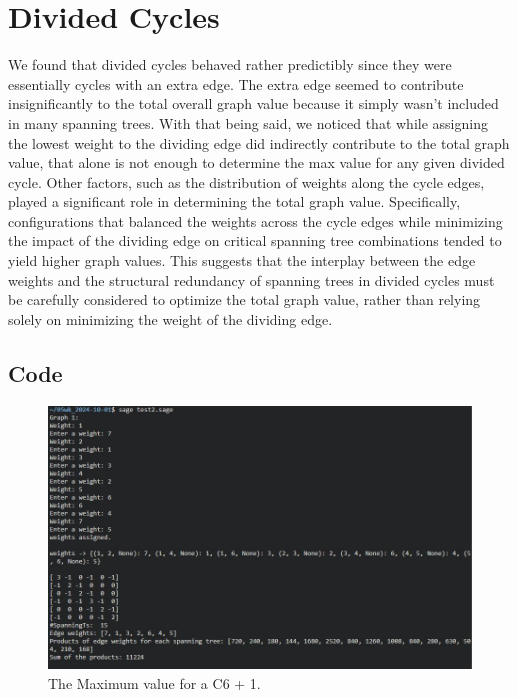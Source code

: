 \documentclass[12pt,letterpaper]{article}
\begin{document}
\section{Divided Cycles} \label{DC}
We found that divided cycles behaved rather predictibly since they were essentially cycles with an extra edge. The extra edge seemed to contribute insignificantly to the total overall graph value because it simply wasn't included in many spanning trees. With that being said, we noticed that while assigning the lowest weight to the dividing edge did indirectly contribute to the total graph value, that alone is not enough to determine the max value for any given divided cycle. Other factors, such as the distribution of weights along the cycle edges, played a significant role in determining the total graph value. Specifically, configurations that balanced the weights across the cycle edges while minimizing the impact of the dividing edge on critical spanning tree combinations tended to yield higher graph values. This suggests that the interplay between the edge weights and the structural redundancy of spanning trees in divided cycles must be carefully considered to optimize the total graph value, rather than relying solely on minimizing the weight of the dividing edge.

\subsection{Code}

	\begin{figure}[h!]  
    \begin{center}
    \includegraphics[width=5in]{f3.1.jpg}
    \caption{\label{Marble} The Maximum value for a C6 + 1.}
    \end{center}
	\end{figure}
\end{document}
